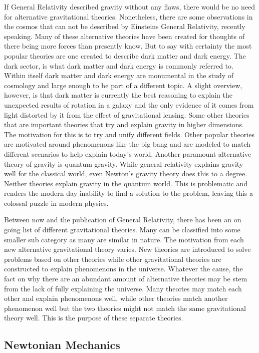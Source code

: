 \documentclass[a4paper]{article}
\begin{document}
 If General Relativity described gravity without any flaws, there would be no need for alternative gravitational theories. Nonetheless, there are some observations in the cosmos that can not be described by Einsteins General Relativity, recently speaking. Many of these alternative theories have been created for thoughts of there being more forces than presently know. But to say with certainty the most popular theories are one created to describe dark matter and dark energy. The dark sector, is what dark matter and dark energy is commonly referred to\cite{Nojiri_2017}.  Within itself dark matter and dark energy are monumental in the study of cosmology and large enough to be part of a different topic. A slight overview, however, is that dark matter is currently the best reasoning to explain the unexpected results of rotation in a galaxy and the only evidence of it comes from light distorted by it from the effect of gravitational lensing. Some other theories that are important theories that try and explain gravity in higher dimensions. The motivation for this is to try and unify different fields. Other popular theories are motivated around phenomenons like the big bang and are modeled to match different scenarios to help explain today's world. Another paramount
alternative theory  of gravity is quantum gravity. While general relativity explains gravity well for the classical world, even Newton's gravity theory does this to a degree. Neither theories explain gravity in the quantum world. This is problematic and renders the modern day inability to find a solution to the problem, leaving this a colossal puzzle in modern physics. 

Between now and the publication of General Relativity, there has been an on going list of different gravitational theories. Many can be classified into some smaller sub category as many are similar in nature. The motivation from each new alternative gravitational theory varies. New theories are introduced to solve problems based on other theories while other gravitational theories are constructed to explain phenomenons in the universe. Whatever the cause, the fact on why there are an abundant amount of alternative theories may be stem from the lack of fully explaining the universe. Many theories may match each other and explain phenomenons well, while other theories match another phenomenon well but the two theories might not match the same gravitational theory well. This is the purpose of these separate theories. 

\subsection{Newtonian Mechanics}
\end{document}
